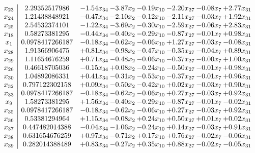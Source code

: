 \documentclass[8pt]{article}
\begin{document}
\[\begin{array}{c| c c@{\hskip 2pt} c@{\hskip 2pt} c@{\hskip 2pt} c@{\hskip 2pt} c@{\hskip 2pt} c@{\hskip 2pt} }
 x_{23}   &  2.29352517986 & -1.54 x_{34} & -3.87 x_{2} & -0.19 x_{10} & -2.20 x_{27} & -0.08 x_{7} & +  2.77 x_{31}\\
 x_{24}   &  1.21438848921 & -0.47 x_{34} & -2.10 x_{2} & -0.12 x_{10} & -2.11 x_{27} & -0.03 x_{7} & +  1.92 x_{31}\\
 x_{25}   &  2.54532374101 & -1.22 x_{34} & -3.69 x_{2} & -0.30 x_{10} & -2.59 x_{27} & -0.06 x_{7} & +  2.83 x_{31}\\
 x_{18}   &  0.58273381295 & -0.44 x_{34} & -0.40 x_{2} & -0.29 x_{10} & -0.87 x_{27} & -0.01 x_{7} & +  0.98 x_{31}\\
 x_{1}   &  0.0978417266187 & -0.18 x_{34} & -0.62 x_{2} & -0.06 x_{10} & +  1.27 x_{27} & -0.03 x_{7} & -0.08 x_{31}\\
 x_{28}   &  1.91366906475 & +  0.81 x_{34} & -0.98 x_{2} & -0.47 x_{10} & -0.35 x_{27} & -0.04 x_{7} & +  0.89 x_{31}\\
 x_{29}   &  1.11654676259 & +  0.71 x_{34} & -0.48 x_{2} & -0.06 x_{10} & -0.37 x_{27} & -0.00 x_{7} & +  1.00 x_{31}\\
 x_{26}   &  0.46618705036 & -0.15 x_{34} & +  0.08 x_{2} & -0.24 x_{10} & -0.50 x_{27} & -0.01 x_{7} & +  0.98 x_{31}\\
 x_{30}   &  1.04892086331 & +  0.41 x_{34} & -0.31 x_{2} & -0.53 x_{10} & -0.37 x_{27} & -0.01 x_{7} & +  0.96 x_{31}\\
 x_{32}   &  0.797122302158 & +  0.09 x_{34} & -0.50 x_{2} & -0.42 x_{10} & +  0.02 x_{27} & -0.03 x_{7} & +  0.90 x_{31}\\
 x_{33}   &  0.0978417266187 & -0.18 x_{34} & -0.62 x_{2} & -0.06 x_{10} & +  0.27 x_{27} & -0.03 x_{7} & +  0.92 x_{31}\\
 x_{9}   &  1.58273381295 & +  1.56 x_{34} & -0.40 x_{2} & -0.29 x_{10} & -0.87 x_{27} & -0.01 x_{7} & -0.02 x_{31}\\
 x_{35}   &  0.0978417266187 & -0.18 x_{34} & -0.62 x_{2} & -0.06 x_{10} & +  0.27 x_{27} & -0.03 x_{7} & +  0.92 x_{31}\\
 x_{36}   &  0.53381294964 & +  1.15 x_{34} & -0.08 x_{2} & +  0.24 x_{10} & +  0.50 x_{27} & +  0.01 x_{7} & +  0.02 x_{31}\\
 x_{37}   &  0.447482014388 & -0.04 x_{34} & -1.06 x_{2} & -0.24 x_{10} & +  0.14 x_{27} & -0.03 x_{7} & +  0.91 x_{31}\\
 x_{38}   &  0.631654676259 & +  0.97 x_{34} & -0.71 x_{2} & +  0.17 x_{10} & +  0.76 x_{27} & -0.02 x_{7} & -0.06 x_{31}\\
 x_{39}   &  0.282014388489 & +  0.83 x_{34} & -0.27 x_{2} & +  0.35 x_{10} & +  0.88 x_{27} & -0.02 x_{7} & -0.05 x_{31}\\

\end{array}\]
\end{document}
